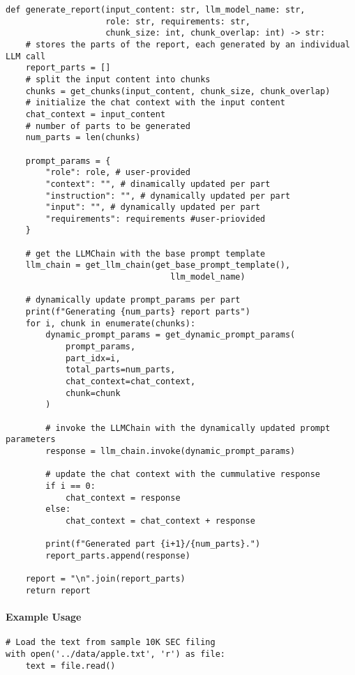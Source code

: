 \begin{verbatim}
def generate_report(input_content: str, llm_model_name: str, 
                    role: str, requirements: str,
                    chunk_size: int, chunk_overlap: int) -> str:
    # stores the parts of the report, each generated by an individual LLM call
    report_parts = [] 
    # split the input content into chunks
    chunks = get_chunks(input_content, chunk_size, chunk_overlap)
    # initialize the chat context with the input content
    chat_context = input_content
    # number of parts to be generated
    num_parts = len(chunks)

    prompt_params = {
        "role": role, # user-provided
        "context": "", # dinamically updated per part
        "instruction": "", # dynamically updated per part
        "input": "", # dynamically updated per part
        "requirements": requirements #user-priovided
    }

    # get the LLMChain with the base prompt template
    llm_chain = get_llm_chain(get_base_prompt_template(), 
                                 llm_model_name)

    # dynamically update prompt_params per part
    print(f"Generating {num_parts} report parts")
    for i, chunk in enumerate(chunks):
        dynamic_prompt_params = get_dynamic_prompt_params(
            prompt_params,
            part_idx=i,
            total_parts=num_parts,
            chat_context=chat_context,
            chunk=chunk
        )
        
        # invoke the LLMChain with the dynamically updated prompt parameters
        response = llm_chain.invoke(dynamic_prompt_params)

        # update the chat context with the cummulative response
        if i == 0:
            chat_context = response
        else:
            chat_context = chat_context + response
            
        print(f"Generated part {i+1}/{num_parts}.")
        report_parts.append(response)

    report = "\n".join(report_parts)
    return report
\end{verbatim}
\paragraph{Example Usage}

\begin{verbatim}
# Load the text from sample 10K SEC filing
with open('../data/apple.txt', 'r') as file:
    text = file.read()
\end{verbatim}


